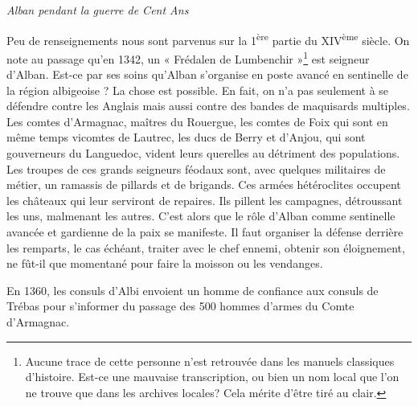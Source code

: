 \begin{center}
    {\Large\itshape Alban pendant la guerre de Cent Ans}
\end{center}

\vspace{1.5em}

\noindent Peu de renseignements nous sont parvenus sur la 1\textsuperscript{ère} partie du XIV\textsuperscript{ème} siècle. On note au passage qu'en 1342, un « Frédalen de Lumbenchir »\footnote{Aucune trace de cette personne n'est retrouvée dans les manuels classiques d'histoire. Est-ce une mauvaise transcription, ou bien un nom local que l'on ne trouve que dans les archives locales? Cela mérite d'être tiré au clair.} est seigneur d'Alban. Est-ce par ses soins qu'Alban s'organise en poste avancé en sentinelle de la région albigeoise ? La chose est possible. En fait, on n'a pas seulement à se défendre contre les Anglais mais aussi contre des bandes de maquisards multiples. Les comtes d'Armagnac, maîtres du Rouergue, les comtes de Foix qui sont en même temps vicomtes de Lautrec, les ducs de Berry et d'Anjou, qui sont gouverneurs du Languedoc, vident leurs querelles au détriment des populations. Les troupes de ces grands seigneurs féodaux sont, avec quelques militaires de métier, un ramassis de pillards et de brigands. Ces armées hétéroclites occupent les châteaux qui leur serviront de repaires. Ils pillent les campagnes, détroussant les uns, malmenant les autres. C'est alors que le rôle d'Alban comme sentinelle avancée et gardienne de la paix se manifeste. Il faut organiser la défense derrière les remparts, le cas échéant, traiter avec le chef ennemi, obtenir son éloignement, ne fût-il que momentané pour faire la moisson ou les vendanges.

\vspace{0.8em}

\noindent En 1360, les consuls d'Albi envoient un homme de confiance aux consuls de Trébas pour s'informer du passage des 500 hommes d'armes du Comte d'Armagnac.
